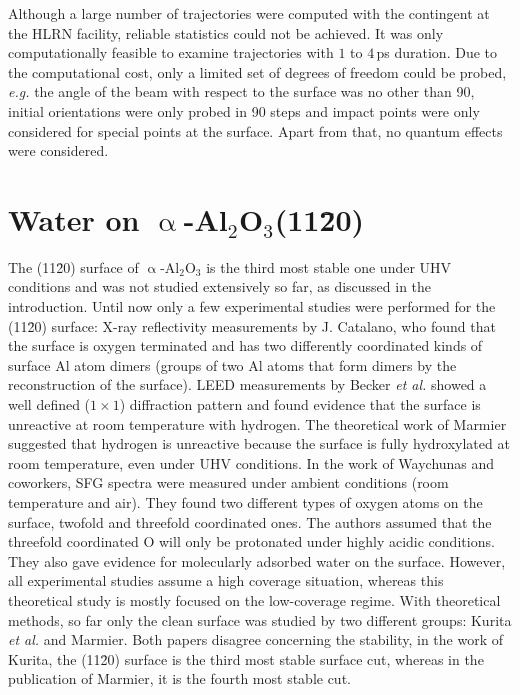 \documentclass[11pt,DIV=13,BCOR=5mm,a4paper,headinclude]{scrbook}
\begin{document}
Although a large number of trajectories were computed with the contingent at the HLRN facility, reliable statistics could not be achieved.
It was only computationally feasible to examine trajectories with $1$ to $4\,$ps duration.
Due to the computational cost, only a limited set of degrees of freedom could be probed, \textit{e.g.} the angle of the beam with respect to the surface was no other than 90\textdegree{}, initial orientations were only probed in 90\textdegree{} steps and impact points were only considered for special points at the surface.
Apart from that, no quantum effects were considered.
\clearpage

\chapter[Water on $\upalpha$-Al$_2$O$_3$(11\=20)]{Water on $\upalpha$-Al$_2$O$_3$(11\=20)\cite{Heiden11-20_2018}}

The (11\=20) surface of $\upalpha$-Al$_2$O$_3$ is the third most stable one under UHV conditions and was not studied extensively so far, as discussed in the introduction.
Until now only a few experimental studies were performed for the (11\=20) surface: X-ray reflectivity measurements by J. Catalano\cite{catalano}, who found that the surface is oxygen terminated and has two differently coordinated kinds of surface Al atom dimers (groups of two Al atoms that form dimers by the reconstruction of the surface).
LEED measurements by Becker \textit{et al.}\cite{Becker2002} showed a well defined ($1\times 1$) diffraction pattern and found evidence that the surface is unreactive at room temperature with hydrogen.
The theoretical work of Marmier\cite{marmier} suggested that hydrogen is unreactive because the surface is fully hydroxylated at room temperature, even under UHV conditions.
In the work of Waychunas and coworkers\cite{sung}, SFG spectra were measured under ambient conditions (room temperature and air).
They found two different types of oxygen atoms on the surface, twofold and threefold coordinated ones.
The authors assumed that the threefold coordinated O will only be protonated under highly acidic conditions.
They also gave evidence for molecularly adsorbed water on the surface.
However, all experimental studies\cite{catalano,sung,Becker2002} assume a high coverage situation, whereas this theoretical study is mostly focused on the low-coverage regime.
With theoretical methods, so far only the clean surface was studied by two different groups: Kurita \textit{et al.}\cite{kuri10} and Marmier\cite{marmier}.
Both papers disagree concerning the stability, in the work of Kurita, the (11\=20) surface is the third most stable surface cut, whereas in the publication of Marmier, it is the fourth most stable cut.
\end{document}
